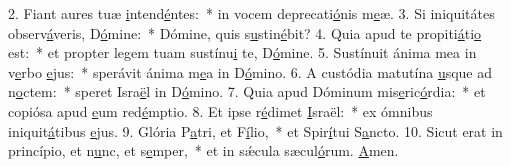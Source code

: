 2. Fiant aures tuæ \uline{i}ntend\uline{é}ntes:~* in vocem deprecati\uline{ó}nis m\uline{e}æ.
3. Si iniquitátes observ\uline{á}veris, D\uline{ó}mine:~* Dómine, quis s\uline{u}stin\uline{é}bit?
4. Quia apud te propiti\uline{á}ti\uline{o} est:~* et propter legem tuam sustínu\uline{i} te, D\uline{ó}mine.
5. Sustínuit ánima mea in v\uline{e}rbo \uline{e}jus:~* sperávit ánima m\uline{e}a in D\uline{ó}mino.
6. A custódia matutína \uline{u}sque ad n\uline{o}ctem:~* speret Isra\uline{ë}l in D\uline{ó}mino.
7. Quia apud Dóminum mis\uline{e}ric\uline{ó}rdia:~* et copiósa apud \uline{e}um red\uline{é}mptio.
8. Et ipse r\uline{é}dimet \uline{I}sraël:~* ex ómnibus iniquit\uline{á}tibus \uline{e}jus.
9. Glória P\uline{a}tri, et F\uline{í}lio,~* et Spir\uline{í}tui S\uline{a}ncto.
10. Sicut erat in princípio, et n\uline{u}nc, et s\uline{e}mper,~* et in sǽcula sæcul\uline{ó}rum. \uline{A}men.
